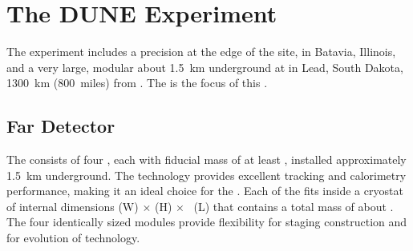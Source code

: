 \section{The DUNE Experiment}

The  experiment includes a precision  at the edge of the  site, in Batavia, Illinois, and a very large, modular  about \SI{1.5}{km} underground at  in Lead, South Dakota, \SI{1300}{km} (\SI{800}{miles}) from . The   is the focus of this . 


\subsection{Far Detector}
\label{ch:dune-det-tech-ov-fd}

The \fdfiducialmass {}  consists of four  , each with fiducial mass of at least \nominalmodsize, installed approximately \SI{1.5}{km} underground. The  technology provides
excellent tracking and calorimetry performance, making it an ideal
choice for the  . Each of the  fits inside a cryostat of internal dimensions
\cryostatwdth (W) $\times$ \cryostatht (H) $\times$ \cryostatlen~(L) that contains a total  mass of about \larmass{}.
 The four identically sized modules provide flexibility for staging construction and for evolution of  technology.

